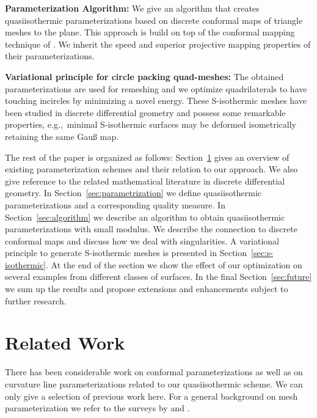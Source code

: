 \documentclass[Thesis.tex]{subfiles}
\begin{document}
\noindent\textbf{Parameterization Algorithm:}
We give an algorithm that creates quasiisothermic parameterizations based on discrete
conformal maps of triangle meshes to the plane. This approach is build on top 
of the conformal mapping technique of \cite{Springborn2008}. We
inherit the speed and superior projective mapping properties of their 
parameterizations.

\noindent\textbf{Variational principle for circle packing quad-meshes:}
The obtained parameterizations are used for remeshing and we optimize 
quadrilaterals to have touching incircles by minimizing a novel energy. These
S-isothermic meshes have been studied in discrete differential geometry and
possess some remarkable properties, e.g.,\ minimal S-isothermic surfaces may be
deformed isometrically retaining the same Gau{\ss} map.

The rest of the paper is organized as follows: Section~\ref{sec:previouswork}
gives an overview of existing parameterization schemes and their relation to
our approach. We also give reference to the related mathematical literature in
discrete differential geometry. In Section~\ref{sec:parametrization} we define
quasiisothermic parameterizations and a corresponding quality measure. 
In Section~\ref{sec:algorithm} we describe an algorithm to
obtain quasiisothermic parameterizations with small modulus. We describe the 
connection to discrete conformal maps and discuss how we deal with singularities. %
A variational principle to generate S-isothermic meshes is presented in
Section~\ref{sec:s-isothermic}. At the end of the section we show the effect of
our optimization on several examples from different classes of surfaces. In the
final Section~\ref{sec:future} we sum up the results and propose extensions and
enhancements subject to further research.


\section{Related Work}
\label{sec:previouswork}

There has been considerable work on conformal parameterizations as well as on
curvature line parameterizations related to our quasiisothermic scheme. We can 
only give a selection of previous work here.
For a general background on mesh parameterization we refer to the surveys by
\cite{Floater2005} and \cite{ShefferPR2006}.
\end{document}
